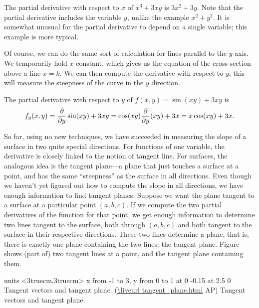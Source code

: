 \example The partial derivative with respect to $x$ of 
$x^3+3xy$ is $3x^2+3y$. Note that the partial derivative includes the
variable $y$, unlike the example $x^2+y^2$. It is somewhat unusual for
the partial derivative to depend on a single variable; this example is
more typical.
\endexample

Of course, we can do the same sort of calculation for lines parallel
to the $y$-axis. We temporarily hold $x$ constant, which gives us the
equation of the cross-section above a line $x=k$. We can then compute
the derivative with respect to $y$; this will measure the steepness of
the curve in the $y$ direction.

\example The partial derivative with respect to $y$ of 
$f(x,y)=\sin(xy)+3xy$ is 
$$f_y(x,y)={\partial\over\partial y}\sin(xy)+3xy=\cos(xy){\partial\over\partial
  y}(xy)+ 3x=x\cos(xy)+3x.
$$
\vskip-10pt
\endexample

So far, using no new techniques, we have succeeded in measuring the
slope of a surface in two quite special directions. For functions of
one variable, the derivative is closely linked to the notion of
tangent line. For surfaces, the analogous idea is the tangent
plane---a plane that just touches a surface at a point, and has the
same ``steepness'' as the surface in all directions. Even though we
haven't yet figured out how to compute the slope in all directions, we
have enough information to find tangent planes. Suppose we want the
plane tangent to a surface at a particular point $(a,b,c)$. If we compute the
two partial derivatives of the function for that point, we get enough
information to determine two lines tangent to the surface, both 
through $(a,b,c)$ and both tangent to the surface in their respective
directions. These two lines determine a plane, that is, there is
exactly one plane containing the two lines: the tangent
plane. Figure~ 
shows (part of) two tangent lines at a point,
and the tangent plane containing them. 

\figure
\texonly
\vbox{\beginpicture
\normalgraphs
\ninepoint
\setcoordinatesystem units <3truecm,3truecm>
\setplotarea x from -1 to 3, y from 0 to 1
 at 0 -0.15
 at 2.5 0
\endpicture}
\begincaption
Tangent vectors and tangent plane.
(\expandafter\url\expandafter{\liveurl tangent_plane.html}%
AP\endurl)
\endcaption
\endtexonly
{}
\begincaption
Tangent vectors and tangent plane.
\endcaption
\endfigure


